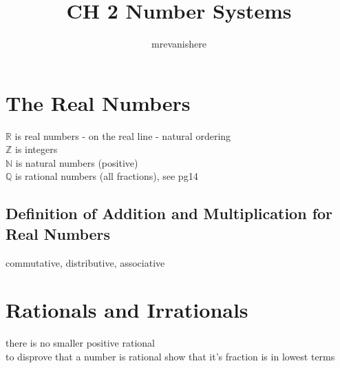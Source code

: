 \documentclass[12]{article}
\newcommand{\R}{\mathbb{R}}
\newcommand{\Q}{\mathbb{Q}}
\newcommand{\N}{\mathbb{N}}
\newcommand{\Z}{\mathbb{Z}}
\begin{document}
\title{CH 2 Number Systems}
\author{mrevanishere}
\maketitle

\section{The Real Numbers}
	\par
	$ \R $ is real numbers - on the real line - natural ordering \\
	$ \Z $ is integers \\
	$ \N $ is natural numbers (positive) \\
	$ \Q $ is rational numbers (all fractions), see pg14
	\subsection{Definition of Addition and Multiplication for Real Numbers}
		commutative, distributive, associative
\section{Rationals and Irrationals}
	there is no smaller positive rational \\
	to disprove that a number is rational show that it's fraction is in
	lowest terms
		
	
\end{document}
